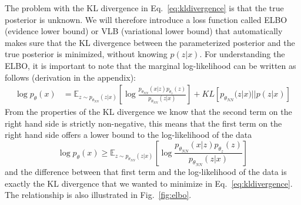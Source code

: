 The problem with the KL divergence in Eq.~\ref{eq:kldivergence} is that the true posterior is unknown. We will therefore introduce a loss function called ELBO (evidence lower bound) or VLB (variational lower bound) that automatically makes sure that the KL divergence between the parameterized posterior and the true posterior is minimized, without knowing $p(z|x)$. For understanding the ELBO, it is important to note that the marginal log-likelihood can be written as follows (derivation in the appendix):
\begin{align}
    \log p_{\theta}(x) & = \mathbb{E}_{z\sim p_{\theta_{NN}}(z|x)}\left[\log \frac{p_{\theta_{NN}}(x|z) p_{\theta_z}(z)}{p_{\theta_{NN}}(z|x)}\right] + KL\left[p_{\theta_{NN}}(z|x)||p(z|x)\right]
\end{align}
From the properties of the KL divergence we know that the second term on the right hand side is strictly non-negative, this means that the first term on the right hand side offers a lower bound to the log-likelihood of the data
\begin{equation}
    \label{eq:elbo}
    \log p_{\theta}(x) \geq \mathbb{E}_{z\sim p_{\theta_{NN}}(z|x)}\left[\log\frac{p_{\theta_{NN}}(x|z) p_{\theta_z}(z)}{p_{\theta_{NN}}(z|x)}\right]
\end{equation}
and the difference between that first term and the log-likelihood of the data is exactly the KL divergence that we wanted to minimize in Eq.~\ref{eq:kldivergence}. The relationship is also illustrated in Fig.~\ref{fig:elbo}.

